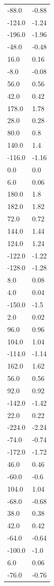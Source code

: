 \begin{longtable}{ll}
-88.0 & -0.88 \\
-124.0 & -1.24 \\
-196.0 & -1.96 \\
-48.0 & -0.48 \\
16.0 & 0.16 \\
-8.0 & -0.08 \\
56.0 & 0.56 \\
42.0 & 0.42 \\
178.0 & 1.78 \\
28.0 & 0.28 \\
80.0 & 0.8 \\
140.0 & 1.4 \\
-116.0 & -1.16 \\
0.0 & 0.0 \\
6.0 & 0.06 \\
180.0 & 1.8 \\
182.0 & 1.82 \\
72.0 & 0.72 \\
144.0 & 1.44 \\
124.0 & 1.24 \\
-122.0 & -1.22 \\
-128.0 & -1.28 \\
8.0 & 0.08 \\
4.0 & 0.04 \\
-150.0 & -1.5 \\
2.0 & 0.02 \\
96.0 & 0.96 \\
104.0 & 1.04 \\
-114.0 & -1.14 \\
162.0 & 1.62 \\
56.0 & 0.56 \\
92.0 & 0.92 \\
-142.0 & -1.42 \\
22.0 & 0.22 \\
-224.0 & -2.24 \\
-74.0 & -0.74 \\
-172.0 & -1.72 \\
46.0 & 0.46 \\
-60.0 & -0.6 \\
104.0 & 1.04 \\
-68.0 & -0.68 \\
38.0 & 0.38 \\
42.0 & 0.42 \\
-64.0 & -0.64 \\
-100.0 & -1.0 \\
6.0 & 0.06 \\
-76.0 & -0.76 \\

\end{longtable}
